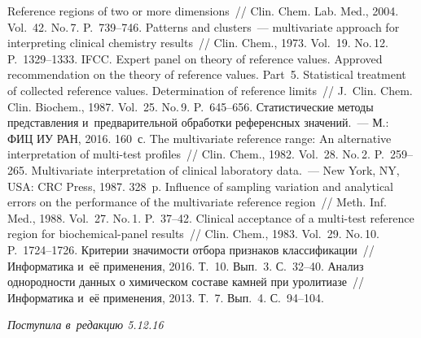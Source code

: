 \begin{multicols}{2}
\vspace*{-6pt}
     
{\small\frenchspacing
 {%
 \begin{thebibliography}{99}
 
 \vspace*{-2pt}
 
 Reference regions of two or more dimensions~// Clin. Chem. Lab. 
Med., 2004. Vol.~42. No.\,7. P.~739--746.
 Patterns and clusters~--- multivariate approach for interpreting 
clinical chemistry results~// Clin. Chem., 1973. Vol.~19. No.\,12. P.~1329--1333.
IFCC. Expert panel on theory of reference values. Approved recommendation on the 
theory of reference values. Part~5. Statistical treatment of collected reference values. 
Determination of reference limits~// J.~Clin. Chem. Clin. Biochem., 1987. Vol.~25. 
No.\,9. P.~645--656.
 Статистические методы представления и~предварительной 
обработки референсных значений.~--- М.: ФИЦ ИУ РАН, 2016. 160~с.
 The multivariate reference range: An alternative 
interpretation of multi-test profiles~// Clin. Chem., 1982. Vol.~28. No.\,2.  
P.~259--265.
 Multivariate interpretation of clinical laboratory  
data.~--- New York, NY, USA: CRC Press, 1987. 328~p.
 Influence of sampling variation and analytical errors on the 
performance of the multivariate reference region~// Meth. Inf. Med., 1988. Vol.~27. 
No.\,1. P.~37--42.
 Clinical acceptance of a multi-test reference region for 
biochemical-panel results~// Clin. Chem., 1983. Vol.~29. No.\,10. P.~1724--1726.
 Критерии значимости отбора признаков классификации~// 
Информатика и~её применения, 2016. Т.~10. Вып.~3. С.~32--40.
 Анализ однородности 
данных о химическом составе камней при уролитиазе~// Информатика и~её 
применения, 2013. Т.~7. Вып.~4. С.~94--104.
 \end{thebibliography}

 }
 }

\end{multicols}

\vspace*{-10pt}

\hfill{\small\textit{Поступила в~редакцию 5.12.16}}

